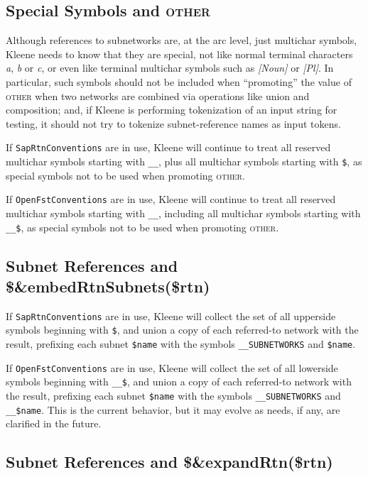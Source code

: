 \documentclass[letterpaper,12pt]{article}
\providecommand{\acro}{}\renewcommand{\acro}{\textsc}
\begin{document}
\subsection{Special Symbols and \acro{other}}

Although references to subnetworks are, at the arc level, just multichar symbols,
Kleene needs to know that they are special, not like normal terminal characters
\emph{a}, \emph{b} or \emph{c}, or even like terminal multichar symbols such as
\emph{[Noun]} or \emph{[Pl]}.  In particular, such symbols should not
be included when ``promoting'' the value of \acro{other} when two networks are combined via
operations like union and composition; and, if Kleene is performing tokenization of
an input string for testing, it should not try to tokenize subnet-reference names as
input tokens.

If \texttt{SapRtnConventions} are in use, Kleene will continue to treat all
reserved multichar symbols starting with \verb!__!, plus all multichar symbols
starting with \verb!$!, as special symbols not to be used when promoting
\acro{other}.

If \texttt{OpenFstConventions} are in use, Kleene will continue to treat all
reserved multichar symbols starting with \verb!__!, including all multichar symbols
starting with \verb!__$!, as special symbols not to be used when promoting
\acro{other}.


\subsection{Subnet References and \$\&embedRtnSubnets(\$rtn)}

If \texttt{SapRtnConventions} are in use, Kleene will collect the set of all upperside
symbols beginning with \verb!$!, and union a copy of each referred-to network with
the result, prefixing each subnet \verb!$name! with the symbols \verb!__SUBNETWORKS!
and \verb!$name!.


If \texttt{OpenFstConventions} are in use, Kleene will collect the set of all
lowerside
symbols beginning with \verb!__$!, and union a copy of each referred-to network with
the result, prefixing each subnet \verb!$name! with the symbols \verb!__SUBNETWORKS!
and \verb!__$name!.  This is the current behavior, but it may evolve as needs, if
any, are clarified in the future.

\subsection{Subnet References and \$\&expandRtn(\$rtn)}
\end{document}
